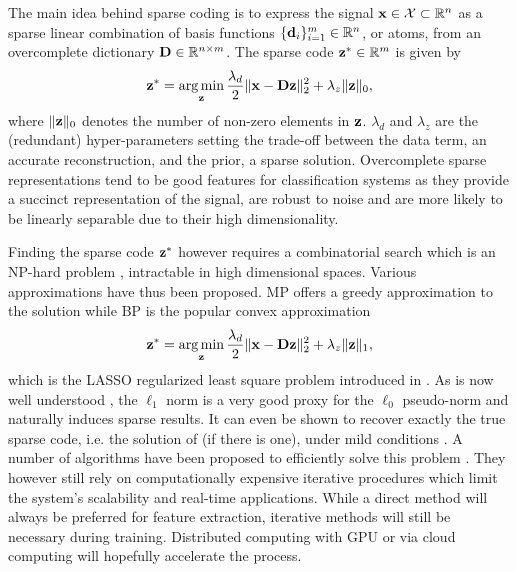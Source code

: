 The main idea behind sparse coding \cite{olshausen1996SparseV1, mairal2008sparseCoding} is to express the signal $\mathbf{x} \in \mathcal{X} \subset \mathbb{R}^n$ as a sparse linear combination of basis functions $\{\mathbf{d}_i\}_{i=1}^m \in \mathbb{R}^n$, or atoms, from an overcomplete dictionary $\mathbf{D} \in \mathbb{R}^{n \times m}$. The sparse code $\mathbf{z}^* \in \mathbb{R}^m$ is given by
\begin{equation} \label{eqn:sparsecoding}
	\mathbf{z}^* = \operatorname*{arg\,min}\limits_{\mathbf{z}} \frac{\lambda_d}{2} \| \mathbf{x} - \mathbf{D} \mathbf{z} \|_2^2 + \lambda_z \| \mathbf{z} \|_0,
\end{equation}
where $\| \mathbf{z} \|_0$ denotes the number of non-zero elements in $\mathbf{z}$.  $\lambda_d$ and $\lambda_z$ are the (redundant) hyper-parameters setting the trade-off between the data term, an accurate reconstruction, and the prior, a sparse solution. Overcomplete sparse representations tend to be good features for classification systems as they provide a succinct representation of the signal, are robust to noise and are more likely to be linearly separable due to their high dimensionality.

Finding the sparse code $\mathbf{z}^*$ however requires a combinatorial search which is an NP-hard problem \cite{natarajan1995sparseNPhard}, intractable in high dimensional spaces. Various approximations have thus been proposed. \gls{MP} \cite{mallat1993MatchingPursuit} offers a greedy approximation to the solution while \gls{BP} \cite{chen1998BasisPursuit} is the popular convex approximation
\begin{equation} \label{eqn:basispursuit}
	\mathbf{z}^* = \operatorname*{arg\,min}\limits_{\mathbf{z}} \frac{\lambda_d}{2} \| \mathbf{x} - \mathbf{D} \mathbf{z} \|_2^2 + \lambda_z \| \mathbf{z} \|_1,
\end{equation}
which is the \gls{LASSO} regularized least square problem introduced in . As is now well understood \cite{candes2005CS, donoho2006CS}, the $\ell_1$ norm is a very good proxy for the $\ell_0$ pseudo-norm and naturally induces sparse results. It can even be shown to recover exactly the true sparse code, i.e. the solution of  (if there is one), under mild conditions \cite{donoho2003OptSparse}.
A number of algorithms have been proposed to efficiently solve this problem \cite{chen1998BasisPursuit, beck2009FISTA, ng2006EfficientSparse, li2009Coordinate}. They however still rely on computationally expensive iterative procedures which limit the system's scalability and real-time applications. While a direct method will always be preferred for feature extraction, iterative methods will still be necessary during training. Distributed computing with \gls{GPU} or via cloud computing will hopefully accelerate the process.

